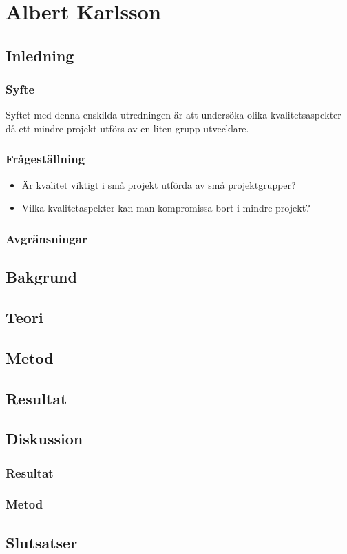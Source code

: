 \section{Albert Karlsson}
\subsection{Inledning}

\subsubsection{Syfte}
Syftet med denna enskilda utredningen är att undersöka olika kvalitetsaspekter då ett mindre projekt utförs av en liten grupp utvecklare.
\subsubsection{Frågeställning}
\begin{itemize}
\item Är kvalitet viktigt i små projekt utförda av små projektgrupper?
\item Vilka kvalitetaspekter kan man kompromissa bort i mindre projekt?
  
\end{itemize}
\subsubsection{Avgränsningar}
\subsection{Bakgrund}
\subsection{Teori}
\subsection{Metod}
\subsection{Resultat}
\subsection{Diskussion}
\subsubsection{Resultat}
\subsubsection{Metod}
\subsection{Slutsatser}
